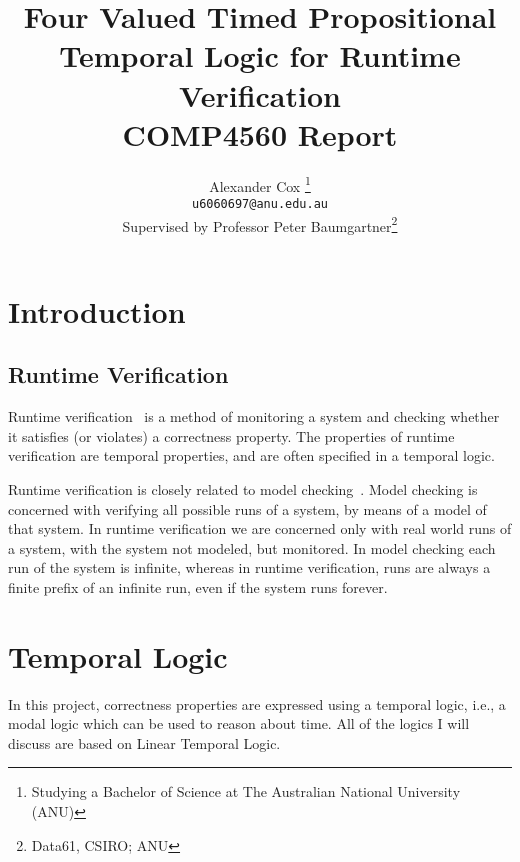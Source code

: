 \documentclass[a4paper]{article}
\title{
  Four Valued Timed Propositional Temporal Logic for Runtime Verification\\
  \normalsize{} COMP4560 Report
}
\author{
  Alexander Cox
  \thanks{Studying a Bachelor of Science at The Australian National University (ANU)}\\
  \small\texttt{u6060697@anu.edu.au}\\
  \normalsize{}Supervised by Professor Peter Baumgartner\thanks{Data61, CSIRO\@; ANU}
}
\begin{document}
\lstset{language=Scala,basicstyle=\ttfamily\small,showstringspaces=false,frame=tl,framerule=1pt,float=tbh,captionpos=b}
\maketitle

\begin{abstract}
\end{abstract}
\newpage
\tableofcontents

\section{Introduction}
\subsection{Runtime Verification}
Runtime verification~\autocite{colin2005rv} is a method of monitoring a system and checking whether it satisfies (or violates) a correctness property.
The properties of runtime verification are temporal properties, and are often specified in a temporal logic. %

Runtime verification is closely related to model checking~\autocite{baier2008principles}. Model checking is concerned with verifying all possible runs of a system, by means of a model of that system. In runtime verification we are concerned only with real world runs of a system, with the system not modeled, but monitored. In model checking each run of the system is infinite, whereas in runtime verification, runs are always a finite prefix of an infinite run, even if the system runs forever.


\section{Temporal Logic}
In this project, correctness properties are expressed using a temporal logic, i.e., a modal logic which can be used to reason about time. All of the logics I will discuss are based on Linear Temporal Logic.

\end{document}
